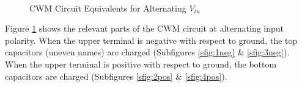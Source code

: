 \begin{figure}[H]%
    \centering
    \qquad
    \\%
    \qquad
    \caption{CWM Circuit Equivalents for Alternating $V_{in}$}%
    \label{fig:CockBothWave}%
\end{figure}

Figure \ref{fig:CockBothWave} shows the relevant parts of the CWM circuit at alternating input polarity.
When the upper terminal is negative with respect to ground,
the top capacitors (uneven names) are charged (Subfigures \ref{sfig:1neg} \& \ref{sfig:3neg}).
When the upper terminal is positive with respect to ground,
the bottom capacitors are charged (Subfigures \ref{sfig:2pos} \& \ref{sfig:4pos}).


